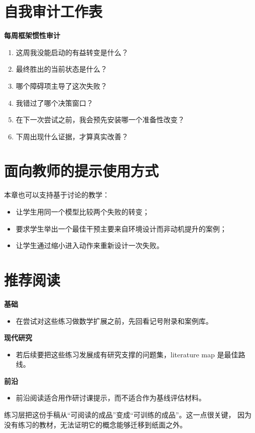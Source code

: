 \section{自我审计工作表}

\begin{templatebox}
\textbf{每周框架惯性审计}
\begin{enumerate}[nosep]
  \item 这周我没能启动的有益转变是什么？
  \item 最终胜出的当前状态是什么？
  \item 哪个障碍项主导了这次失败？
  \item 我错过了哪个决策窗口？
  \item 在下一次尝试之前，我会预先安装哪一个准备性改变？
  \item 下周出现什么证据，才算真实改善？
\end{enumerate}
\end{templatebox}

\section{面向教师的提示使用方式}

本章也可以支持基于讨论的教学：
\begin{itemize}[nosep]
  \item 让学生用同一个模型比较两个失败的转变；
  \item 要求学生举出一个最佳干预主要来自环境设计而非动机提升的案例；
  \item 让学生通过缩小进入动作来重新设计一次失败。
\end{itemize}

\section{推荐阅读}

\begin{readingbox}
\textbf{基础}
\begin{itemize}[nosep]
  \item 在尝试对这些练习做数学扩展之前，先回看记号附录和案例库。
\end{itemize}
\textbf{现代研究}
\begin{itemize}[nosep]
  \item 若后续要把这些练习发展成有研究支撑的问题集，literature map
        是最佳路线。
\end{itemize}
\textbf{前沿}
\begin{itemize}[nosep]
  \item 前沿阅读适合用作研讨课提示，而不适合作为基线评估材料。
\end{itemize}
\end{readingbox}

\begin{summarybox}
练习层把这份手稿从“可阅读的成品”变成“可训练的成品”。这一点很关键，
因为没有练习的教材，无法证明它的概念能够迁移到纸面之外。
\end{summarybox}